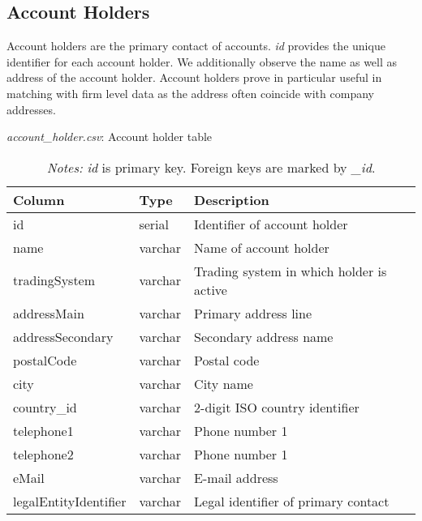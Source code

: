 \documentclass[authoryear]{elsarticle}
\begin{document}
\subsection{Account Holders}

Account holders are the primary contact of accounts. \textit{id} provides the unique identifier for each account holder. We additionally observe the name as well as address of the account holder. Account holders prove in particular useful in matching with firm level data as the address often coincide with company addresses. 

\begin{table}[htbp]\scriptsize
	\caption{\textit{account\_holder.csv}: Account holder table}\label{tab:tbl_holder}
	\centering
	\begin{tabular*}{\textwidth}{@{}@{\extracolsep{\fill}} lll @{}}
		\toprule
		\toprule
		\textbf{Column} & \textbf{Type}  & \textbf{Description} \\
		\midrule
		id    & serial & Identifier of account holder \\
		name  & varchar & Name of account holder \\
		tradingSystem & varchar & Trading system in which holder is active\\
		addressMain & varchar & Primary address line \\
		addressSecondary & varchar & Secondary address name \\
		postalCode & varchar & Postal code \\
		city  & varchar & City name \\
		country\_id & varchar & 2-digit ISO country identifier \\
		telephone1  & varchar & Phone number 1 \\
		telephone2  & varchar & Phone number 1 \\
		eMail  & varchar & E-mail address \\
		legalEntityIdentifier & varchar & Legal identifier of primary contact\\
		\bottomrule
		\bottomrule
	\end{tabular*}%
	\vspace{-3ex}
\caption*{\footnotesize \emph{Notes:} \textit{id} is primary key. Foreign keys are marked by \textit{\_id}.}
\vspace{0ex}
\end{table}
\end{document}
